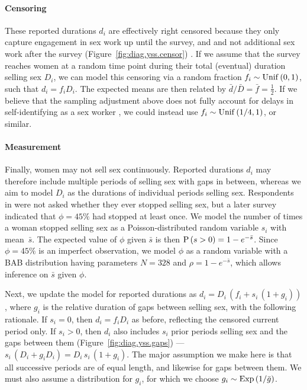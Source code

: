 \paragraph{Censoring}
These reported durations $d_i$ are effectively right censored
because they only capture engagement in sex work up until the survey, and
and not additional sex work after the survey
(Figure~\ref{fig:diag.yss.censor}) \cite{Fazito2012}.
If we assume that the survey reaches women at a random time point
during their total (eventual) duration selling sex $D_i$, we can model this censoring via
a random fraction $f_i \sim \mathrm{Unif}\,(0,1)$, such that $d_i = f_i D_i$.
The expected means are then related by $\bar{d} / \bar{D} = \bar{f} = \frac12$.
If we believe that the sampling adjustment above does not fully account for
delays in self-identifying as a sex worker \cite{Cheuk2020},
we could instead use $f_i \sim \mathrm{Unif}\,(1/4,1)$, or similar.
\paragraph{Measurement}
Finally, women may not sell sex continuously.
Reported durations $d_i$ may therefore include
multiple periods of selling sex with gaps in between,
whereas we aim to model $D_i$ as the durations of individual periods selling sex.
Respondents in \cite{Baral2014} were not asked whether they ever stopped selling sex,
but a later survey \cite{EswKP2014} indicated that $\phi = 45\%$ had stopped at least once.
We model the number of times a woman stopped selling sex as
a Poisson-distributed random variable $s_i$ with mean~$\bar{s}$.
The expected value of $\phi$ given $\bar{s}$ is then $\mathrm{P}\,(s > 0) = 1 - e^{-\bar{s}}$.
Since $\phi = 45\%$ is an imperfect observation,
we model $\phi$ as a random variable with a BAB distribution
having parameters $N = 328$ and $\rho = 1 - e^{-\bar{s}}$,
which allows inference on $\bar{s}$ given $\phi$.
\par
Next, we update the model for reported durations as $d_i = D_i\,(f_i + s_i\,(1 + g_i))$,
where $g_i$ is the relative duration of gaps between selling sex,
with the following rationale.
If $s_i = 0$, then $d_i = f_i D_i$ as before, reflecting the censored current period only.
If $s_i > 0$, then $d_i$ also includes $s_i$ prior periods selling sex and the gaps between them
(Figure~\ref{fig:diag.yss.gaps}) --- \ie $s_i\,(D_i + g_i D_i) = D_i\,s_i\,(1 + g_i)$.
The major assumption we make here is that
all successive periods are of equal length, and likewise for gaps between them.
We must also assume a distribution for $g_i$, for which we choose
$g_i \sim \mathrm{Exp}\,(1/\bar{g})$.
